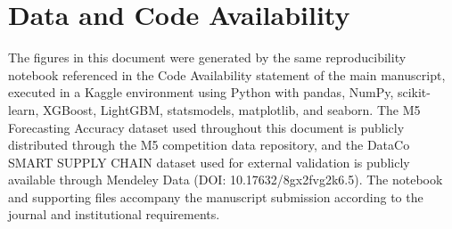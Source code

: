 \documentclass[preprint,12pt]{elsarticle}
\begin{document}
\FloatBarrier

\section*{Data and Code Availability}

The figures in this document were generated by the same reproducibility notebook referenced in the Code Availability statement of the main manuscript, executed in a Kaggle environment using Python with pandas, NumPy, scikit-learn, XGBoost, LightGBM, statsmodels, matplotlib, and seaborn.
The M5 Forecasting Accuracy dataset used throughout this document is publicly distributed through the M5 competition data repository, and the DataCo SMART SUPPLY CHAIN dataset used for external validation is publicly available through Mendeley Data (DOI: 10.17632/8gx2fvg2k6.5).
The notebook and supporting files accompany the manuscript submission according to the journal and institutional requirements.
\end{document}
